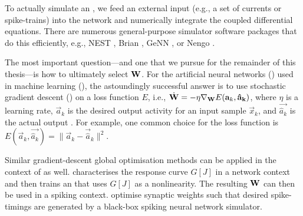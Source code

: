 To actually simulate an \SNN, we feed an external input (e.g., a set of currents or spike-trains) into the network and numerically integrate the coupled differential equations.
There are numerous general-purpose simulator software packages that do this efficiently, e.g., NEST \citep{gewaltig2007nest}, Brian \citep{stimberg2019brian}, GeNN \citep{yavuz2016genn}, or Nengo \citep{bekolay2014nengo}.

The most important question---and one that we pursue for the remainder of this thesis---is how to ultimately select $\mathbf{W}$.
For the artificial neural networks (\ANNpl) used in machine learning (), the astoundingly successful answer is to use stochastic gradient descent (\SGD) on a loss function $E$, i.e., $\dot{\mathbf{W}} = -\eta \nabla_{\mathbf{W}} E(\mathbf{a}_k, \mathbf{\hat a_k})$, where $\eta$ is a learning rate, $\vec a_k$ is the desired output activity for an input sample $\vec x_k$, and $\vec{\hat a_k}$ is the actual output \citep{lecun2015deep}.
For example, one common choice for the loss function is $E(\vec a_k, \vec {\hat a_k}) = \|\vec a_k - \vec{\hat a}_k\|^2$.

Similar gradient-descent global optimisation methods can be applied in the context of \SNNpl as well.
 characterises the \LIF response curve $G[J]$ in a network context and then trains an \ANN that uses $G[J]$ as a nonlinearity.
The resulting $\mathbf{W}$ can then be used in a spiking context.
 optimise synaptic weights such that desired spike-timings are generated by a black-box spiking neural network simulator.



